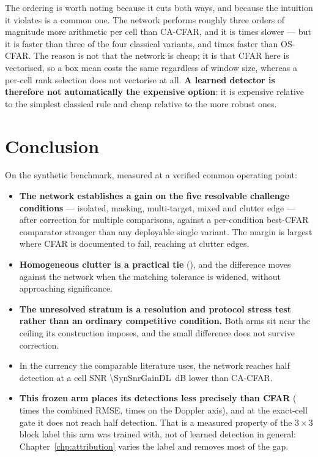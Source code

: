 The ordering is worth noting because it cuts both ways, and because the intuition it violates is a
common one. The network performs roughly three orders of magnitude more arithmetic per cell than
CA-CFAR, and it is \RuntimeDLoverCA{} times slower --- but it is faster than three of the four
classical variants, and \RuntimeOSoverDL{} times faster than OS-CFAR. The reason is not that the
network is cheap; it is that CFAR here is vectorised, so a box mean costs the same regardless of
window size, whereas a per-cell rank selection does not vectorise at all. \textbf{A learned
detector is therefore not automatically the expensive option}: it is expensive relative to the
simplest classical rule and cheap relative to the more robust ones.

\section{Conclusion}

On the synthetic benchmark, measured at a verified common operating point:

\begin{itemize}
\itemsep3pt
\item \textbf{The network establishes a gain on the five resolvable challenge conditions} ---
isolated, masking, multi-target, mixed and clutter edge --- after correction for multiple
comparisons, against a per-condition best-CFAR comparator stronger than any deployable single
variant. The margin is largest where CFAR is documented to fail, reaching
\SynClutterEdgeDiff{} at clutter edges.
\item \textbf{Homogeneous clutter is a practical tie} (\SynClutterDiff), and the difference moves
against the network when the matching tolerance is widened, without approaching significance.
\item \textbf{The unresolved stratum is a resolution and protocol stress test rather than an
ordinary competitive condition.} Both arms sit near the ceiling its construction imposes, and the
small difference does not survive correction.
\item In the currency the comparable literature uses, the network reaches half detection at a cell
SNR \SI{\SynSnrGainDL}{\deci\bel} lower than CA-CFAR.
\item \textbf{This frozen arm places its detections less precisely than CFAR}
(\LocRmseRatio{} times the combined RMSE, \LocDvRatio{} times on the Doppler axis), and at the
exact-cell gate it does not reach half detection. That is a measured property of the $3\times3$
block label this arm was trained with, not of learned detection in general:
Chapter~\ref{chp:attribution} varies the label and removes most of the gap.
\end{itemize}

